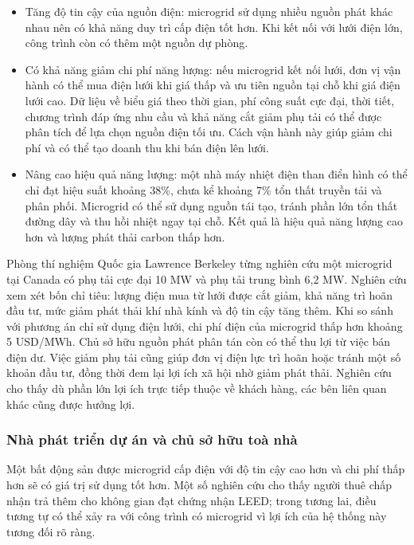 \documentclass{thesis}
\begin{document}
\begin{itemize}
  \item Tăng độ tin cậy của nguồn điện: microgrid sử dụng nhiều nguồn
    phát khác nhau nên có khả năng duy trì cấp điện tốt hơn. Khi kết nối
    với lưới điện lớn, công trình còn có thêm một nguồn dự phòng.
  \item Có khả năng giảm chi phí năng lượng: nếu microgrid kết nối
    lưới, đơn vị vận hành có thể mua điện lưới khi giá thấp và ưu tiên
    nguồn tại chỗ khi giá điện lưới cao. Dữ liệu về biểu giá theo thời
    gian, phí công suất cực đại, thời tiết, chương trình đáp ứng nhu cầu
    và khả năng cắt giảm phụ tải có thể được phân tích để lựa chọn nguồn
    điện tối ưu. Cách vận hành này giúp giảm chi phí và có thể tạo doanh
    thu khi bán điện lên lưới.
  \item Nâng cao hiệu quả năng lượng: một nhà máy nhiệt điện than điển
    hình có thể chỉ đạt hiệu suất khoảng 38\%, chưa kể khoảng 7\% tổn
    thất truyền tải và phân phối. Microgrid có thể sử dụng nguồn tái tạo,
    tránh phần lớn tổn thất đường dây và thu hồi nhiệt ngay tại chỗ. Kết
    quả là hiệu quả năng lượng cao hơn và lượng phát thải carbon thấp hơn.
\end{itemize}

Phòng thí nghiệm Quốc gia Lawrence Berkeley từng nghiên cứu một
microgrid tại Canada có phụ tải cực đại 10 MW và phụ tải trung bình
6,2 MW. Nghiên cứu xem xét bốn chỉ tiêu: lượng điện mua từ lưới được
cắt giảm, khả năng trì hoãn đầu tư, mức giảm phát thải khí nhà kính
và độ tin cậy tăng thêm. Khi so sánh với phương án chỉ sử dụng điện
lưới, chi phí điện của microgrid thấp hơn khoảng 5 USD/MWh. Chủ sở
hữu nguồn phát phân tán còn có thể thu lợi từ việc bán điện dư. Việc
giảm phụ tải cũng giúp đơn vị điện lực trì hoãn hoặc tránh một số
khoản đầu tư, đồng thời đem lại lợi ích xã hội nhờ giảm phát thải.
Nghiên cứu cho thấy dù phần lớn lợi ích trực tiếp thuộc về khách
hàng, các bên liên quan khác cũng được hưởng lợi.

\subsubsection{Nhà phát triển dự án và chủ sở hữu toà nhà}

Một bất động sản được microgrid cấp điện với độ tin cậy cao hơn và
chi phí thấp hơn sẽ có giá trị sử dụng tốt hơn. Một số nghiên cứu cho
thấy người thuê chấp nhận trả thêm cho không gian đạt chứng nhận
LEED; trong tương lai, điều tương tự có thể xảy ra với công trình có
microgrid vì lợi ích của hệ thống này tương đối rõ ràng.
\end{document}
